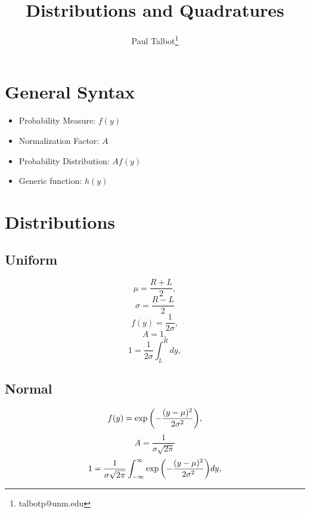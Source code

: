 \documentclass[11pt]{article}
\begin{document}
\title{Distributions and Quadratures}

\author[]{Paul Talbot\thanks{talbotp@unm.edu}}
\renewcommand\Authands{ and }
\maketitle

\section{General Syntax}
\begin{itemize}
\item Probability Measure: $f(y)$
\item Normalization Factor: $A$
\item Probability Distribution: $Af(y)$
\item Generic function: $h(y)$
\end{itemize}


\section{Distributions}
\subsection{Uniform}
\begin{equation}
\mu = \frac{R+L}{2},
\end{equation}
\begin{equation}
\sigma = \frac{R-L}{2}
\end{equation}
\begin{equation}
f(y) = \frac{1}{2\sigma},
\end{equation}
\begin{equation}
A=1,
\end{equation}
\begin{equation}
  1 = \frac{1}{2\sigma}\int_L^R dy,
\end{equation}

\subsection{Normal}
\begin{equation}
f(y) = \exp\qty(-\frac{(y-\mu)^2}{2\sigma^2}),
\end{equation}
\begin{equation}
A = \frac{1}{\sigma\sqrt{2\pi}}
\end{equation}
\begin{equation}
  1 =\frac{1}{\sigma\sqrt{2\pi}} \int_{-\infty}^\infty \exp\qty( -\frac{(y-\mu)^2}{2\sigma^2} )dy,
\end{equation}
\end{document}
